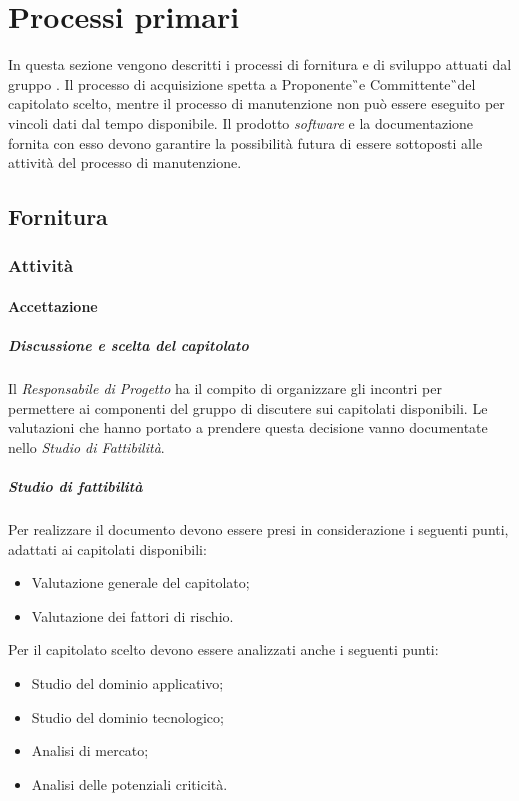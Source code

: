 \section{Processi primari}
In questa sezione vengono descritti i processi di fornitura e di sviluppo attuati dal gruppo \GRUPPO. Il processo di acquisizione spetta a Proponente\G\ e Committente\G\  del capitolato scelto, mentre il processo di manutenzione non può essere eseguito per vincoli dati dal tempo disponibile. Il prodotto \textit{software} e la documentazione fornita con esso devono garantire la possibilità futura di essere sottoposti alle attività del processo di manutenzione.
\subsection{Fornitura}
\subsubsection{Attività}
\paragraph{Accettazione}
\subparagraph{Discussione e scelta del capitolato}
Il \textit{Responsabile di Progetto} ha il compito di organizzare gli incontri per permettere ai componenti del gruppo di discutere sui capitolati disponibili.
Le valutazioni che hanno portato a prendere questa decisione vanno documentate nello \textit{Studio di Fattibilità}.
\subparagraph{Studio di fattibilità}
Per realizzare il documento devono essere presi in considerazione i seguenti punti, adattati ai capitolati disponibili:
\begin{itemize}
\item{Valutazione generale del capitolato;}
\item{Valutazione dei fattori di rischio.}
\end{itemize}

Per il capitolato scelto devono essere analizzati anche i seguenti punti:
\begin{itemize}
	\item{Studio del dominio applicativo;}
	\item{Studio del dominio tecnologico;}
	\item{Analisi di mercato;}
	\item{Analisi delle potenziali criticità.}
\end{itemize}

